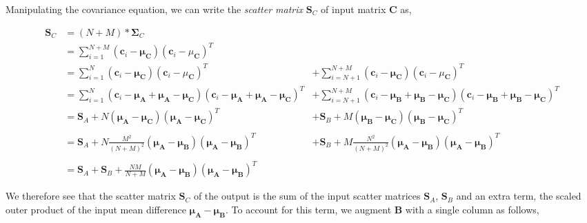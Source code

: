Manipulating the covariance equation, we can write the \emph{scatter matrix} $\mathbf{S}_C$ of input matrix $\mathbf{C}$ as,

\begin{changemargin}{-0.5in}{0in}

\begin{equation}
\begin{array}{llll}
\mathbf{S}_C &= (N+M) * \mathbf{\Sigma}_C \\
&= \sum\limits_{i=1}^{N+M} (\mathbf{c}_i-\mathbf{\mu}_\mathbf{C})(\mathbf{c}_i-\mu_\mathbf{C})^T \\
&= \sum\limits_{i=1}^{N} (\mathbf{c}_i-\mathbf{\mu}_\mathbf{C})(\mathbf{c}_i-\mu_\mathbf{C})^T &+ \sum\limits_{i=N+1}^{N+M} (\mathbf{c}_i-\mathbf{\mu}_\mathbf{C})(\mathbf{c}_i-\mu_\mathbf{C})^T\\
&= \sum\limits_{i=1}^{N}
 (\mathbf{c}_i-\mathbf{\mu}_\mathbf{A} +\mathbf{\mu}_\mathbf{A} - \mathbf{\mu}_\mathbf{C}) (\mathbf{c}_i-\mathbf{\mu}_\mathbf{A} +\mathbf{\mu}_\mathbf{A} - \mathbf{\mu}_\mathbf{C})^T &+  \sum\limits_{i=N+1}^{N+M}
 (\mathbf{c}_i-\mathbf{\mu}_\mathbf{B} +\mathbf{\mu}_\mathbf{B} - \mathbf{\mu}_\mathbf{C}) (\mathbf{c}_i-\mathbf{\mu}_\mathbf{B} +\mathbf{\mu}_\mathbf{B} - \mathbf{\mu}_\mathbf{C})^T \\
&=\mathbf{S}_A + N(\mathbf{\mu}_\mathbf{A} - \mathbf{\mu}_\mathbf{C})(\mathbf{\mu}_\mathbf{A} - \mathbf{\mu}_\mathbf{C})^T &+ \mathbf{S}_B +  M(\mathbf{\mu}_\mathbf{B} - \mathbf{\mu}_\mathbf{C})(\mathbf{\mu}_\mathbf{B} - \mathbf{\mu}_\mathbf{C})^T\\\\

&=\mathbf{S}_A + N\frac{M^2}{(N+M)^2}(\mathbf{\mu}_\mathbf{A} - \mathbf{\mu}_\mathbf{B})(\mathbf{\mu}_\mathbf{A} - \mathbf{\mu}_\mathbf{B})^T  &+\mathbf{S}_B +  M\frac{N^2}{(N+M)^2}(\mathbf{\mu}_\mathbf{A} - \mathbf{\mu}_\mathbf{B})(\mathbf{\mu}_\mathbf{A} - \mathbf{\mu}_\mathbf{B})^T\\\\

&=\mathbf{S}_A + \mathbf{S}_B + \frac{NM}{N+M}(\mathbf{\mu}_\mathbf{A} - \mathbf{\mu}_\mathbf{B})(\mathbf{\mu}_\mathbf{A} - \mathbf{\mu}_\mathbf{B})^T  
\end{array}
\end{equation}
\end{changemargin}


We therefore see that the scatter matrix $\mathbf{S}_C$ of the output is the sum of the input scatter matrices $\mathbf{S}_A$, $\mathbf{S}_B$ and an extra term, the scaled outer product of the input mean difference $\mathbf{\mu}_\mathbf{A} - \mathbf{\mu}_\mathbf{B}$.  To account for this term, we augment $\mathbf{B}$ with a single column as follows,

